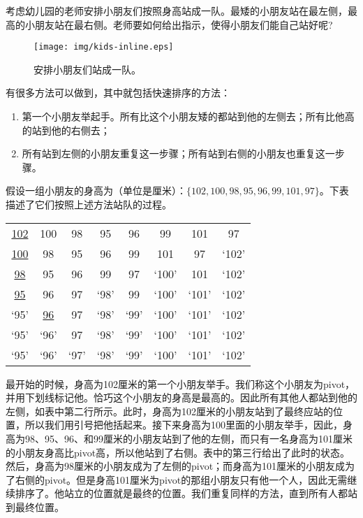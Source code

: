 \documentclass[UTF8]{article}
\begin{document}
考虑幼儿园的老师安排小朋友们按照身高站成一队。最矮的小朋友站在最左侧，最高的小朋友站在最右侧。老师要如何给出指示，使得小朋友们能自己站好呢?

\begin{figure}[htbp]
 \centering
 \texttt{[image: img/kids-inline.eps]}
 \caption{安排小朋友们站成一队。}
 \label{fig:knuth-ssort}
\end{figure}

有很多方法可以做到，其中就包括快速排序的方法：

\begin{enumerate}
  \item 第一个小朋友举起手。所有比这个小朋友矮的都站到他的左侧去；所有比他高的站到他的右侧去；
  \item 所有站到左侧的小朋友重复这一步骤；所有站到右侧的小朋友也重复这一步骤。
\end{enumerate}

假设一组小朋友的身高为（单位是厘米）：$\{102, 100, 98, 95, 96, 99, 101, 97\}$。下表描述了它们按照上述方法站队的过程。

\begin{tabular}{ | c c c c c c c c |}
\hline
\underline{102} & 100 & 98 & 95 & 96 & 99 & 101 & 97 \\
\underline{100} & 98 & 95 & 96 & 99 & 101 & 97 & `102' \\
\underline{98} & 95 & 96 & 99 & 97 & `100' & 101 & `102' \\
\underline{95} & 96 & 97 & `98' & 99 & `100' & `101' & `102' \\
`95' & \underline{96} & 97 & `98' & `99' & `100' & `101' & `102' \\
`95' & `96' & 97 & `98' & `99' & `100' & `101' & `102' \\
`95' & `96' & `97' & `98' & `99' & `100' & `101' & `102' \\
\hline
\end{tabular}

最开始的时候，身高为102厘米的第一个小朋友举手。我们称这个小朋友为pivot，并用下划线标记他。恰巧这个小朋友的身高是最高的。因此所有其他人都站到他的左侧，如表中第二行所示。此时，身高为102厘米的小朋友站到了最终应站的位置，所以我们用引号把他括起来。接下来身高为100里面的小朋友举手，因此，身高为98、95、96、和99厘米的小朋友站到了他的左侧，而只有一名身高为101厘米的小朋友身高比pivot高，所以他站到了右侧。表中的第三行给出了此时的状态。然后，身高为98厘米的小朋友成为了左侧的pivot；而身高为101厘米的小朋友成为了右侧的pivot。但是身高101厘米为pivot的那组小朋友只有他一个人，因此无需继续排序了。他站立的位置就是最终的位置。我们重复同样的方法，直到所有人都站到最终位置。
\end{document}
